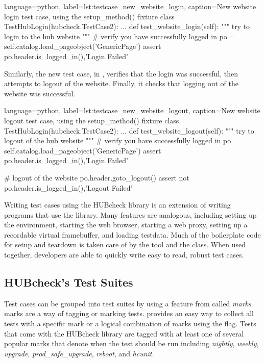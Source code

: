 \begin{xcode}{%
  language=python,%
  label=lst:testcase_new_website_login,%
  caption={New website login test case, using the setup\_method() fixture}%
}
class TestHubLogin(hubcheck.TestCase2):
    ...
    def test_website_login(self):
        """ try to login to the hub website """
        # verify you have successfully logged in
        po = self.catalog.load_pageobject('GenericPage')
        assert po.header.is_logged_in(),'Login Failed'
\end{xcode}


Similarly, the new  test case, in
, verifies that the login was successful,
then attempts to logout of the website. Finally, it checks that logging out of
the website was successful.


\begin{xcode}{%
  language=python,%
  label=lst:testcase_new_website_logout,%
  caption={New website logout test case, using the setup\_method() fixture}%
}
class TestHubLogin(hubcheck.TestCase2):
    ...
    def test_website_logout(self):
        """ try to logout of the hub website """
        # verify you have successfully logged in
        po = self.catalog.load_pageobject('GenericPage')
        assert po.header.is_logged_in(),'Login Failed'

        # logout of the website
        po.header.goto_logout()
        assert not po.header.is_logged_in(),'Logout Failed'
\end{xcode}


Writing test cases using the HUBcheck library is an extension of writing
programs that use the library. Many features are analogous, including setting
up the environment, starting the web browser, starting a web proxy, setting up
a recordable virtual framebuffer, and loading testdata. Much of the boilerplate
code for setup and teardown is taken care of by the
 tool and the  class. When used
together, developers are able to quickly write easy to read, robust test cases.

\subsection{HUBcheck's Test Suites}
\label{ssec:hubcheck_tests_suites}

Test cases can be grouped into test suites by using a feature from
 called \textit{marks}.   marks are
a way of tagging or marking tests.   provides an easy way
to collect all tests with a specific mark or a logical combination of marks
using the  flag.  Tests that come with the HUBcheck library are
tagged with at least one of several popular marks that denote when the test
should be run including \textit{nightly}, \textit{weekly}, \textit{upgrade},
\textit{prod\_safe\_upgrade}, \textit{reboot}, and \textit{hcunit}.
